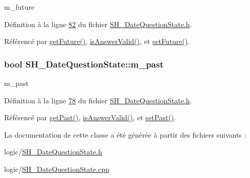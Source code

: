 m\-\_\-future 



Définition à la ligne \hyperlink{SH__DateQuestionState_8h_source_l00082}{82} du fichier \hyperlink{SH__DateQuestionState_8h_source}{S\-H\-\_\-\-Date\-Question\-State.\-h}.



Référencé par \hyperlink{classSH__DateQuestionState_aa0ac7bfdd8528fdbc7b517d7f2f1fcc7}{get\-Future()}, \hyperlink{classSH__DateQuestionState_aacd24891431755fb857c17a864d39ba9}{is\-Answer\-Valid()}, et \hyperlink{classSH__DateQuestionState_ae160da14278cb25ce255f108f481d5eb}{set\-Future()}.

\hypertarget{classSH__DateQuestionState_afa33fd208cf539167bcc26c83e57d803}{
\subsubsection[{m\-\_\-past}]{\setlength{\rightskip}{0pt plus 5cm}bool S\-H\-\_\-\-Date\-Question\-State\-::m\-\_\-past\hspace{0.3cm}{\ttfamily [private]}}}\label{classSH__DateQuestionState_afa33fd208cf539167bcc26c83e57d803}


m\-\_\-past 



Définition à la ligne \hyperlink{SH__DateQuestionState_8h_source_l00078}{78} du fichier \hyperlink{SH__DateQuestionState_8h_source}{S\-H\-\_\-\-Date\-Question\-State.\-h}.



Référencé par \hyperlink{classSH__DateQuestionState_a13b9815a4c8b0f5bd78426efdc754b8c}{get\-Past()}, \hyperlink{classSH__DateQuestionState_aacd24891431755fb857c17a864d39ba9}{is\-Answer\-Valid()}, et \hyperlink{classSH__DateQuestionState_a06f77c3d6449354c0d1135cc9755dd41}{set\-Past()}.



La documentation de cette classe a été générée à partir des fichiers suivants \-:\begin{DoxyCompactItemize}
\item 
logic/\hyperlink{SH__DateQuestionState_8h}{S\-H\-\_\-\-Date\-Question\-State.\-h}\item 
logic/\hyperlink{SH__DateQuestionState_8cpp}{S\-H\-\_\-\-Date\-Question\-State.\-cpp}\end{DoxyCompactItemize}
